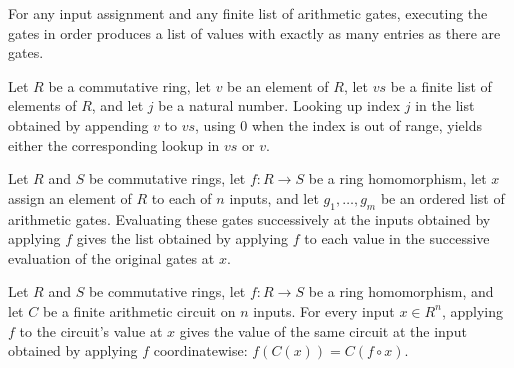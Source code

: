 \begin{theorem}
\label{Randomized.AlgCircuit.length_run}
\leanok
{}
For any input assignment and any finite list of arithmetic gates, executing the gates in
order produces a list of values with exactly as many entries as there are gates.
\end{theorem}

\begin{theorem}
\label{Randomized.AlgCircuit.getD_append_singleton}
\leanok
{}
Let $R$ be a commutative ring, let $v$ be an element of $R$, let $vs$ be a finite list
of elements of $R$, and let $j$ be a natural number. Looking up index $j$ in the list
obtained by appending $v$ to $vs$, using $0$ when the index is out of range, yields
either the corresponding lookup in $vs$ or $v$.
\end{theorem}

\begin{theorem}
\label{Randomized.AlgCircuit.run_map}
\leanok
{}
Let $R$ and $S$ be commutative rings, let $f:R\to S$ be a ring homomorphism, let $x$
assign an element of $R$ to each of $n$ inputs, and let $g_1,\ldots,g_m$ be an ordered
list of arithmetic gates. Evaluating these gates successively at the inputs obtained by
applying $f$ gives the list obtained by applying $f$ to each value in the successive
evaluation of the original gates at $x$.
\end{theorem}

\begin{theorem}
\label{Randomized.AlgCircuit.map_eval}
\leanok
{}
Let $R$ and $S$ be commutative rings, let $f:R\to S$ be a ring homomorphism, and let $C$
be a finite arithmetic circuit on $n$ inputs. For every input $x\in R^n$, applying $f$
to the circuit's value at $x$ gives the value of the same circuit at the input obtained
by applying $f$ coordinatewise: $f(C(x))=C(f\circ x)$.
\end{theorem}

